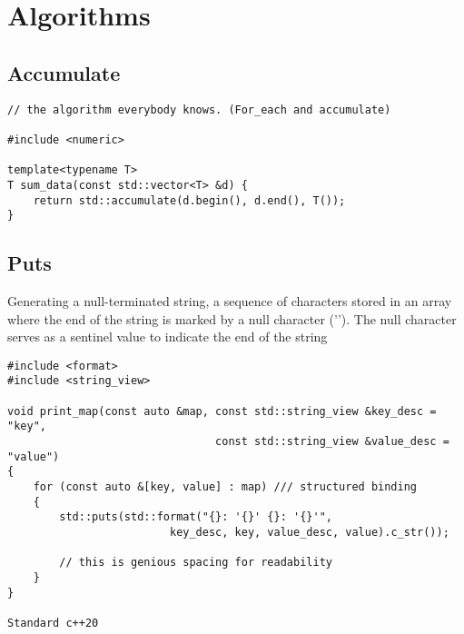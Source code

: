 \section{Algorithms}

\subsection{Accumulate}

\begin{verbatim}
// the algorithm everybody knows. (For_each and accumulate)

#include <numeric>

template<typename T>
T sum_data(const std::vector<T> &d) {
    return std::accumulate(d.begin(), d.end(), T());
}
\end{verbatim}

\subsection{Puts}

Generating a null-terminated string,  a sequence of characters stored in an array
where the end of the string is marked by a null character ('\0'). 
The null character serves as a sentinel value to indicate the end of the string

\begin{verbatim}
#include <format>
#include <string_view>

void print_map(const auto &map, const std::string_view &key_desc = "key",
                                const std::string_view &value_desc = "value")
{
    for (const auto &[key, value] : map) /// structured binding
    {
        std::puts(std::format("{}: '{}' {}: '{}'",
                         key_desc, key, value_desc, value).c_str());

        // this is genious spacing for readability
    }
}

Standard c++20
\end{verbatim}
